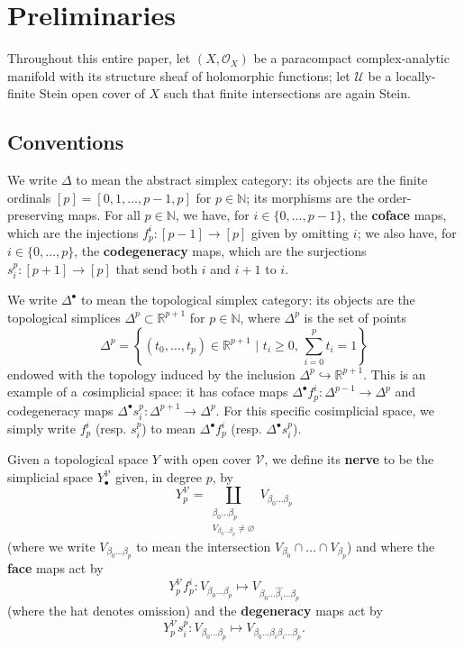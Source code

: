 \documentclass[11pt,fleqn]{article}
\theoremstyle{plain}
\theoremstyle{definition}
\theoremstyle{remark}
\numberwithin{equation}{theorem}
\newcommand{\cover}{\mathcal{U}}
\newcommand{\anothercover}{\mathcal{V}}
\newcommand{\OO}{\mathcal{O}}
\newcommand{\define}[1]{\textbf{#1}}
\newcommand{\anothernerve}[1]{Y_{#1}^\anothercover}
\begin{document}
\section{Preliminaries}\label{section:preliminaries}

    Throughout this entire paper, let $(X,\OO_X)$ be a paracompact complex-analytic manifold with its structure sheaf of holomorphic functions; let $\cover$ be a locally-finite Stein open cover of $X$ such that finite intersections are again Stein.


    \subsection{Conventions}

        We write $\Delta$ to mean the abstract simplex category: its objects are the finite ordinals $[p]=[0,1,\ldots,p-1,p]$ for $p\in\mathbb{N}$; its morphisms are the order-preserving maps.
        For all $p\in\mathbb{N}$, we have, for $i\in\{0,\ldots,p-1\}$, the \define{coface} maps, which are the injections $f_p^i\colon[p-1]\to[p]$ given by omitting $i$; we also have, for $i\in\{0,\ldots,p\}$, the \define{codegeneracy} maps, which are the surjections $s_i^p\colon[p+1]\to[p]$ that send both $i$ and $i+1$ to $i$.

        We write $\Delta^\bullet$ to mean the topological simplex category: its objects are the topological simplices $\Delta^p\subset\mathbb{R}^{p+1}$ for $p\in\mathbb{N}$, where $\Delta^p$ is the set of points
        \[
            \Delta^p
            =
            \left\{
                (t_0,\ldots,t_p)
                \in \mathbb{R}^{p+1}
                \,\,\Big\vert\,\,
                t_i\geqslant0,
                \,\sum_{i=0}^p t_i =1
            \right\}
        \]
        endowed with the topology induced by the inclusion $\Delta^p\hookrightarrow\mathbb{R}^{p+1}$.
        This is an example of a \emph{co}simplicial space: it has {coface} maps $\Delta^\bullet f_p^i\colon\Delta^{p-1}\to\Delta^p$ and {codegeneracy} maps $\Delta^\bullet s_i^p\colon\Delta^{p+1}\to\Delta^p$.
        For this specific cosimplicial space, we simply write $f_p^i$ (resp. $s_i^p$) to mean $\Delta^\bullet f_p^i$ (resp. $\Delta^\bullet s_i^p$).

        Given a topological space $Y$ with open cover $\anothercover$, we define its \define{nerve} to be the simplicial space $\anothernerve{\bullet}$ given, in degree $p$, by
        \[
            \anothernerve{p} = \coprod_{\substack{\beta_0\ldots\beta_p \\ V_{\beta_0\ldots\beta_p}\neq\varnothing}} V_{\beta_0\ldots\beta_p}
        \]
        (where we write $V_{\beta_0\ldots\beta_p}$ to mean the intersection $V_{\beta_0}\cap\ldots\cap V_{\beta_p}$) and where the \define{face} maps act by
        \[
            \anothernerve{p}f_p^i\colon V_{\beta_0\ldots\beta_p} \mapsto V_{\beta_0\ldots\widehat{\beta_i}\ldots\beta_p}
        \]
        (where the hat denotes omission) and the \define{degeneracy} maps act by
        \[
            \anothernerve{p}s_i^p\colon V_{\beta_0\ldots\beta_p} \mapsto V_{\beta_0\ldots\beta_i\beta_i\ldots\beta_p}.
        \]
\end{document}
